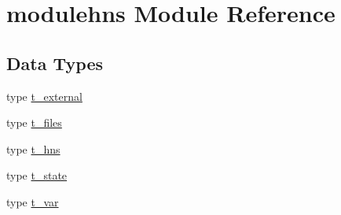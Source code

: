 \hypertarget{namespacemodulehns}{}\section{modulehns Module Reference}
\label{namespacemodulehns}
\subsection*{Data Types}
\begin{DoxyCompactItemize}
\item 
type \mbox{\hyperlink{structmodulehns_1_1t__external}{t\+\_\+external}}
\item 
type \mbox{\hyperlink{structmodulehns_1_1t__files}{t\+\_\+files}}
\item 
type \mbox{\hyperlink{structmodulehns_1_1t__hns}{t\+\_\+hns}}
\item 
type \mbox{\hyperlink{structmodulehns_1_1t__state}{t\+\_\+state}}
\item 
type \mbox{\hyperlink{structmodulehns_1_1t__var}{t\+\_\+var}}
\end{DoxyCompactItemize}

